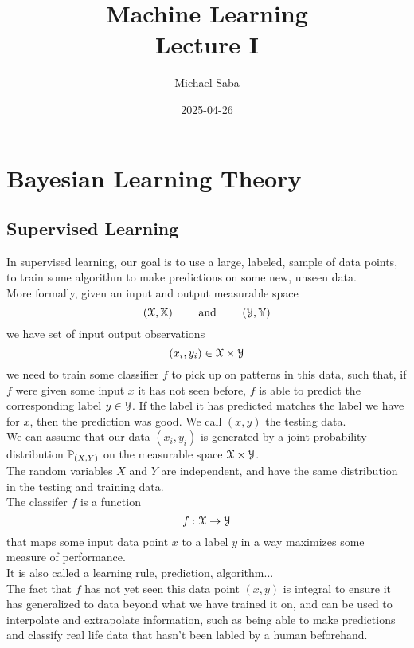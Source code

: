 \documentclass[12pt]{article}
\title{%
    \Huge Machine Learning \\
    \Large Lecture I
}
\date{2025-04-26}
\author{Michael Saba}
\begin{document}
\maketitle
\newpage
\setlength{\parindent}{0pt}

\section*{Bayesian Learning Theory}

\subsection*{Supervised Learning}

In supervised learning,
our goal is to use a large,
labeled, sample of data points,
to train some algorithm
to make predictions on some new,
unseen data. \\

More formally,
given an input and output measurable
space
\[ (\mathcal{X}, \mathbb{X}) \qquad 
\text{ and } \qquad (\mathcal{Y}, \mathbb{Y}) \]
we have set of input output 
observations
\[ (x_i, y_i) \in \mathcal{X} \times \mathcal{Y} \]
we need to train some classifier $f$
to pick up on patterns in this data,
such that, if $f$
were given some input $x$
it has not seen before,
$f$ is able to predict the corresponding
label $y \in \mathcal{Y}$.
If the label it has predicted
matches the label we have for $x$,
then the prediction was good.
We call $(x, y)$ the testing data. \\

We can assume that our data
$(x_i, y_i)$ is
generated by a joint probability
distribution $\mathbb{P}_{(X, Y)}$
on the measurable space
$\mathcal{X} \times \mathcal{Y}$. \\
The random variables $X$ and $Y$
are independent,
and have the same distribution in the
testing and training data. \\

The classifer $f$ is a function
\[ f: \mathcal{X} \to \mathcal{Y} \]
that maps some input data point $x$
to a label $y$
in a way maximizes some
measure of performance. \\
It is also called a learning rule,
prediction, algorithm... \\

The fact that $f$
has not yet seen this data point $(x, y)$
is integral to ensure it has generalized
to data beyond what we have trained it on,
and can be used to interpolate and
extrapolate information,
such as being able to make predictions
and classify real life data
that hasn't been labled by a human
beforehand. \\
\end{document}
